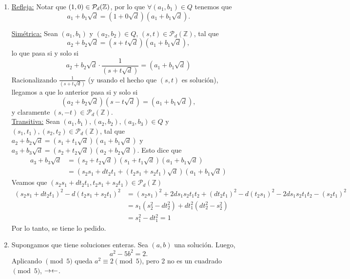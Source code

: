 \begin{sol}
	\begin{enumerate}
		\item \underline{Refleja:} Notar que $(1, 0) \in \mathcal{P}_d(\mathbb{Z})$, por lo que $\forall (a_1, b_1) \in Q$ tenemos que
		      $$a_1 + b_1\sqrt{d} = (1 + 0\sqrt{d})(a_1 + b_1 \sqrt{d}).$$

		      \underline{Simétrica:} Sean $(a_1, b_1)$ y $(a_2, b_2) \in Q$, $(s, t) \in \mathcal{P}_d(\mathbb{Z})$, tal que
		      $$a_2 + b_2\sqrt{d} = (s + t\sqrt{d})(a_1 + b_1\sqrt{d}),$$
		      lo que pasa si y solo si
		      $$a_2 + b_2\sqrt{d} \cdot \frac{1}{(s + t\sqrt{d})} = (a_1 + b_1\sqrt{d})$$
		      Racionalizando $\frac{1}{(s + t\sqrt{d})}$ (y usando el hecho que $(s, t)$ es solución), llegamos a que lo anterior pasa si y solo si
		      $$(a_2 + b_2 \sqrt{d})(s - t \sqrt{d}) = (a_1 + b_1 \sqrt{d}),$$
		      y claramente $(s, -t) \in \mathcal{P}_d (\mathbb{Z})$. \\

		      \underline{Transitiva:} Sean $(a_1, b_1), (a_2, b_2), (a_3, b_3) \in Q$ y $(s_1, t_1), (s_2, t_2) \in \mathcal{P}_d (\mathbb{Z})$, tal que
		      $a_2 + b_2\sqrt{d} = (s_1 + t_1\sqrt{d})(a_1 + b_1\sqrt{d})$ y $a_3 + b_3\sqrt{d} = (s_2 + t_2\sqrt{d})(a_2 + b_2\sqrt{d})$. Esto dice que
		      \begin{align*}
			      a_3 + b_3\sqrt{d} & = (s_2 + t_2\sqrt{d})(s_1 + t_1\sqrt{d})(a_1 + b_1\sqrt{d})         \\
			                        & = (s_2s_1 + dt_2t_1 + (t_2s_1 + s_2t_1)\sqrt{d})(a_1 + b_1\sqrt{d})
		      \end{align*}
		      Veamos que $(s_2s_1 + dt_2t_1, t_2s_1 + s_2t_1) \in \mathcal{P}_d (\mathbb{Z})$
		      \begin{align*}
			      (s_2s_1 + dt_2t_1)^2 - d(t_2s_1 + s_2t_1)^2 & = (s_2s_1)^2+ 2ds_1s_2t_1t_2 + (dt_2t_1)^2 - d(t_2s_1)^2 -2ds_1s_2t_1t_2 - (s_2t_1)^2 \\
			                                                  & = s_1(s_2^2 - dt_2^2) + dt_1^2(dt_2^2 - s_2^2)                                        \\
			                                                  & = s_1^2 - dt_1^2 = 1
		      \end{align*}
		      Por lo tanto, se tiene lo pedido.

		\item Supongamos que tiene soluciones enteras. Sea $(a, b)$ una solución. Luego,
		      $$a^2 - 5b^2 = 2.$$
		      Aplicando $\pmod{5}$ queda $a^2 \equiv 2 \pmod{5}$, pero 2 no es un cuadrado $\pmod{5}$, $\rightarrow\leftarrow$.
	\end{enumerate}
\end{sol}

